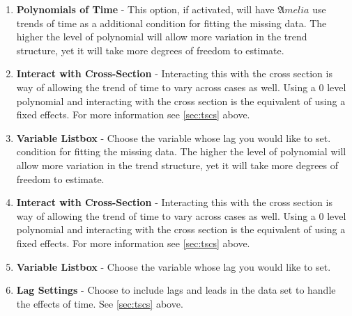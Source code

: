 \documentclass[12pt,titlepage]{article}
\begin{document}
\begin{enumerate}
\item \textbf{Polynomials of Time} - This option, if activated, will
  have ${\mathfrak Amelia}$ use trends of time as a additional
  condition for fitting the missing data.  The higher the level of
  polynomial will allow more variation in the trend structure, yet it
  will take more degrees of freedom to estimate.
\item \textbf{Interact with Cross-Section} - Interacting this with the
  cross section is way of allowing the trend of time to vary across
  cases as well.  Using a 0 level polynomial and interacting with the
  cross section is the equivalent of using a fixed effects.  For more
  information see \ref{sec:tscs} above.
\item \textbf{Variable Listbox} - Choose the variable whose lag you
  would like to set.
  condition for fitting the missing data.  The higher the level of
  polynomial will allow more variation in the trend structure, yet it
  will take more degrees of freedom to estimate.
\item \textbf{Interact with Cross-Section} - Interacting this with the
  cross section is way of allowing the trend of time to vary across
  cases as well.  Using a 0 level polynomial and interacting with the
  cross section is the equivalent of using a fixed effects.  For more
  information see \ref{sec:tscs} above.
\item \textbf{Variable Listbox} - Choose the variable whose lag you
  would like to set.
\item \textbf{Lag Settings} - Choose to include lags and leads in the
  data set to handle the effects of time.  See \ref{sec:tscs} above.
\end{enumerate}
\end{document}
